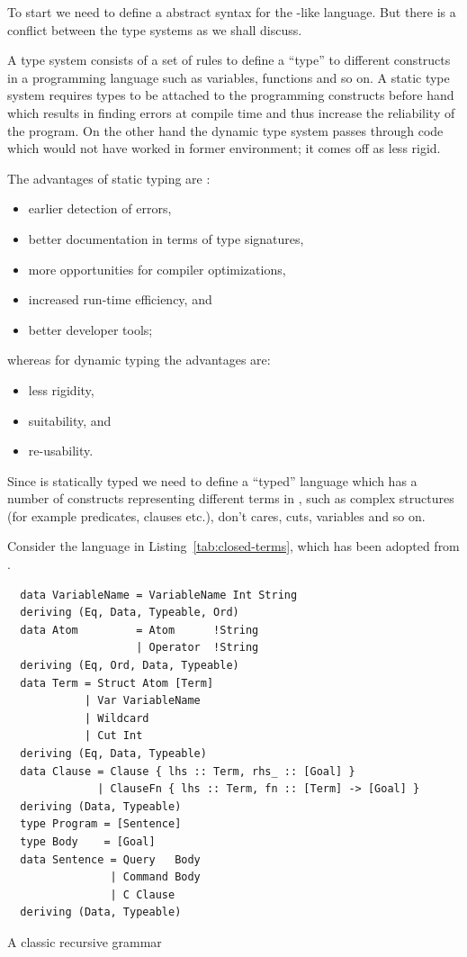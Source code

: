 \documentclass[thesis-solanki.tex]{subfiles}
\begin{document}
To start we need to define a abstract syntax for the -like language.
But\butbut{} there is a conflict between the type systems as we shall discuss.



A type system consists of a set of rules to define a ``type'' to different constructs in a
programming language such as variables, functions and so on.
A static type system requires types to be attached to the programming constructs before hand which results in
finding errors at compile time and thus increase the reliability of the program.
On the other hand the dynamic type system passes through code which would not have worked in former
environment; it comes off as less rigid.


The advantages of static typing \cite{meijer2004static} are :
\begin{itemize}
\item earlier detection of errors,
\item better documentation in terms of type signatures,
\item more opportunities for compiler optimizations,
\item increased run-time efficiency, and
\item better developer tools;
\end{itemize}

whereas for dynamic typing the advantages are:
\begin{itemize}
\item less rigidity,
\item suitability, and
\item re-usability.
\end{itemize}


Since  is statically typed we need to define a ``typed'' language which
has a number of constructs representing different terms in , such as complex structures
(for example predicates, clauses etc.), don't cares, cuts, variables and so on.

Consider the language in Listing~\ref{tab:closed-terms}, which has been adopted from
\cite{prolog-lib}.

\begin{code-list}[H]
\begin{verbatim}
  data VariableName = VariableName Int String
  deriving (Eq, Data, Typeable, Ord)
  data Atom         = Atom      !String
                    | Operator  !String
  deriving (Eq, Ord, Data, Typeable)
  data Term = Struct Atom [Term]
            | Var VariableName
            | Wildcard
            | Cut Int
  deriving (Eq, Data, Typeable)
  data Clause = Clause { lhs :: Term, rhs_ :: [Goal] }
              | ClauseFn { lhs :: Term, fn :: [Term] -> [Goal] }
  deriving (Data, Typeable)
  type Program = [Sentence]
  type Body    = [Goal]
  data Sentence = Query   Body
                | Command Body
                | C Clause
  deriving (Data, Typeable)
\end{verbatim}
  \caption{A classic recursive grammar}
  \label{tab:closed-terms}
\end{code-list}
\end{document}
